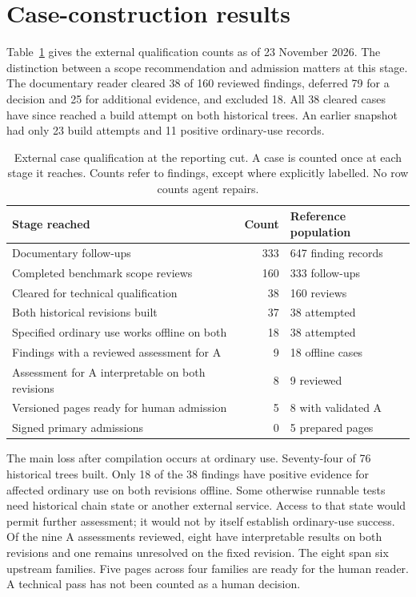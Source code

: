 \section{Case-construction results}
Table~\ref{tab:intake} gives the external qualification counts as of 23 November 2026. The distinction between a scope recommendation and admission matters at this stage. The documentary reader cleared 38 of 160 reviewed findings, deferred 79 for a decision and 25 for additional evidence, and excluded 18. All 38 cleared cases have since reached a build attempt on both historical trees. An earlier snapshot had only 23 build attempts and 11 positive ordinary-use records.

\begin{table}[t]
\caption{External case qualification at the reporting cut. A case is counted once at each stage it reaches. Counts refer to findings, except where explicitly labelled. No row counts agent repairs.}
\label{tab:intake}
\small
\begin{tabular}{@{}p{.57\linewidth}rp{.27\linewidth}@{}}
\toprule
Stage reached & Count & Reference population \\
\midrule
Documentary follow-ups & 333 & 647 finding records \\
Completed benchmark scope reviews & 160 & 333 follow-ups \\
Cleared for technical qualification & 38 & 160 reviews \\
Both historical revisions built & 37 & 38 attempted \\
Specified ordinary use works offline on both & 18 & 38 attempted \\
Findings with a reviewed assessment for A & 9 & 18 offline cases \\
Assessment for A interpretable on both revisions & 8 & 9 reviewed \\
Versioned pages ready for human admission & 5 & 8 with validated A \\
Signed primary admissions & 0 & 5 prepared pages \\
\bottomrule
\end{tabular}
\end{table}

The main loss after compilation occurs at ordinary use. Seventy-four of 76 historical trees built. Only 18 of the 38 findings have positive evidence for affected ordinary use on both revisions offline. Some otherwise runnable tests need historical chain state or another external service. Access to that state would permit further assessment; it would not by itself establish ordinary-use success. Of the nine A assessments reviewed, eight have interpretable results on both revisions and one remains unresolved on the fixed revision. The eight span six upstream families. Five pages across four families are ready for the human reader. A technical pass has not been counted as a human decision.

